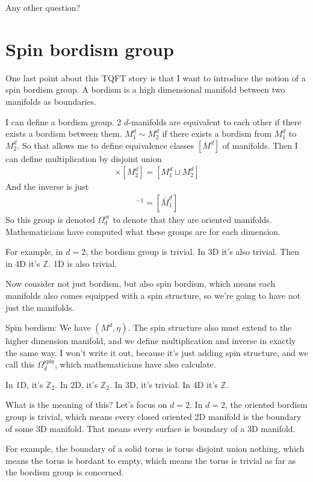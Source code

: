 Any other question?

\section{Spin bordism group}
One last point about this TQFT story is that I want to introduce the notion of a
spin bordism group.
A bordism is a high dimensional manifold between two manifolds as boundaries.

I can define a bordism group.
2 $d$-manifolds are equivalent to each other if there exists a bordism between
them.
$M_1^d \sim M_2^d$ if there exists a bordism from $M_1^d$ to $M_2^d$.
So that allows me to define equivalence classes $[M^d]$
of manifolds.
Then 
I can define multiplication by disjoint union
\begin{align}
    [M_1^d]\times [M_2^d]=
    [M_1^d \sqcup M_2^d]
\end{align}
And the inverse is just
\begin{align}
    [M_1^d]^{-1} = [\bar{M}_1^d]
\end{align}
So this group is denoted $\Omega^{\text{or}}_d$
to denote that they are oriented manifolds.
Mathematicians have computed what these groups are for each dimension.

For example, in $d=2$,
the bordism group is trivial.
In 3D it's also trivial.
Then in 4D it's $\mathbb{Z}$.
1D is also trivial.

Now consider not just bordism,
but also spin bordism,
which means each manifolds also comes equipped with a spin structure,
so we're going to have not just the manifolds.

Spin bordism:
We have $(M^d,\eta)$.
The spin structure also must extend to the higher dimension manifold,
and we define multiplication and inverse in exactly the same way.
I won't write it out,
because it's just adding spin structure,
and we call this
$\Omega_d^{\textrm{spin}}$,
which mathematicians have also calculate.

In 1D, it's $\mathbb{Z}_2$.
In 2D, it's $\mathbb{Z}_2$.
In 3D, it's trivial.
In 4D it's $\mathbb{Z}$.

What is the meaning of this?
Let's focus on $d=2$.
In $d=2$, the oriented bordism group is trivial,
which means every closed oriented 2D manifold is the boundary of some 3D
manifold.
That means every surface is boundary of a 3D manifold.

For example,
the boundary of a solid torus
is torus disjoint union nothing,
which means the torus is bordant to empty,
which means the torus is trivial as far as the bordism group is concerned.


